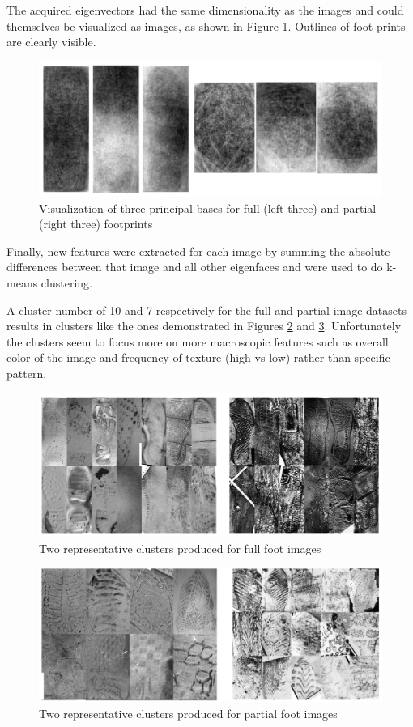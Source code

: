 \documentclass{article}
\begin{document}
The acquired eigenvectors had the same dimensionality as the images and could themselves be visualized as images, as shown in Figure \ref{fig:eigenfeet}. Outlines of foot prints are clearly visible.

\begin{figure}[h]
  \includegraphics[width=\linewidth]{eigenfeet.png}
  \caption{Visualization of three principal bases for full (left three) and partial (right three) footprints }
  \label{fig:eigenfeet}
\end{figure}

Finally, new features were extracted for each image by summing the absolute differences between that image and all other eigenfaces and were used to do k-means clustering.

A cluster number of 10 and 7 respectively for the full and partial image datasets results in clusters like the ones demonstrated in Figures \ref{fig:full_cluster} and \ref{fig:partial_cluster}. Unfortunately the clusters seem to focus more on more macroscopic features such as overall color of the image and frequency of texture (high vs low) rather than specific pattern. 

\begin{figure}[h]
  \includegraphics[width=\linewidth]{full_cluster.png}
  \caption{Two representative clusters produced for full foot images}
  \label{fig:full_cluster}
\end{figure}

\begin{figure}[h]
  \includegraphics[width=\linewidth]{partial_cluster.png}
  \caption{Two representative clusters produced for partial foot images}
  \label{fig:partial_cluster}
\end{figure}
\end{document}
